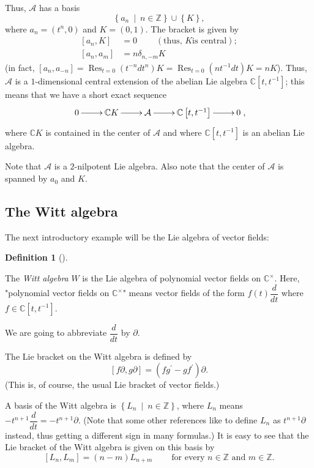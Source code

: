 \documentclass
[numbers=enddot,12pt,final,onecolumn,german,notitlepage]{scrartcl}%
\theoremstyle{definition}
\newtheorem{defi}[theo]{Definition}
\newenvironment{definition}[1][]
{\begin{defi}[#1]\begin{leftbar}}
{\end{leftbar}\end{defi}}
\begin{document}
Thus, $\mathcal{A}$ has a basis
\[
\left\{  a_{n}\ \mid\ n\in\mathbb{Z}\right\}  \cup\left\{  K\right\}  ,
\]
where $a_{n}=\left(  t^{n},0\right)  $ and $K=\left(  0,1\right)  $. The
bracket is given by%
\begin{align*}
\left[  a_{n},K\right]   &  =0\ \ \ \ \ \ \ \ \ \ \left(  \text{thus, }K\text{
is central}\right)  ;\\
\left[  a_{n},a_{m}\right]   &  =n\delta_{n,-m}K
\end{align*}
(in fact, $\left[  a_{n},a_{-n}\right]  =\operatorname*{Res}\nolimits_{t=0}%
\left(  t^{-n}dt^{n}\right)  K=\operatorname*{Res}\nolimits_{t=0}\left(
nt^{-1}dt\right)  K=nK$). Thus, $\mathcal{A}$ is a $1$-dimensional central
extension of the abelian Lie algebra $\mathbb{C}\left[  t,t^{-1}\right]  $;
this means that we have a short exact sequence%
\[
\xymatrix{
0 \ar[r] & \mathbb C K \ar[r] & \mathcal A \ar[r] & \mathbb C\left[t,t^{-1}\right] \ar[r] & 0
},
\]
where $\mathbb{C}K$ is contained in the center of $\mathcal{A}$ and where
$\mathbb{C}\left[  t,t^{-1}\right]  $ is an abelian Lie algebra.

Note that $\mathcal{A}$ is a $2$-nilpotent Lie algebra. Also note that the
center of $\mathcal{A}$ is spanned by $a_{0}$ and $K$.

\subsection{The Witt algebra}

The next introductory example will be the Lie algebra of vector fields:

\begin{definition}
The \textit{Witt algebra }$W$ is the Lie algebra of polynomial vector fields
on $\mathbb{C}^{\times}$. Here, "polynomial vector fields on $\mathbb{C}%
^{\times}$" means vector fields of the form $f\left(  t\right)  \dfrac{d}{dt}$
where $f\in\mathbb{C}\left[  t,t^{-1}\right]  $.

We are going to abbreviate $\dfrac{d}{dt}$ by $\partial$.

The Lie bracket on the Witt algebra is defined by%
\[
\left[  f\partial,g\partial\right]  =\left(  fg^{\prime}-gf^{\prime}\right)
\partial.
\]
(This is, of course, the usual Lie bracket of vector fields.)
\end{definition}

A basis of the Witt algebra is $\left\{  L_{n}\ \mid\ n\in\mathbb{Z}\right\}
$, where $L_{n}$ means $-t^{n+1}\dfrac{d}{dt}=-t^{n+1}\partial$. (Note that
some other references like to define $L_{n}$ as $t^{n+1}\partial$ instead,
thus getting a different sign in many formulas.) It is easy to see that the
Lie bracket of the Witt algebra is given on this basis by
\[
\left[  L_{n},L_{m}\right]  =\left(  n-m\right)  L_{n+m}%
\ \ \ \ \ \ \ \ \ \ \text{for every }n\in\mathbb{Z}\text{ and }m\in
\mathbb{Z}.
\]
\end{document}
